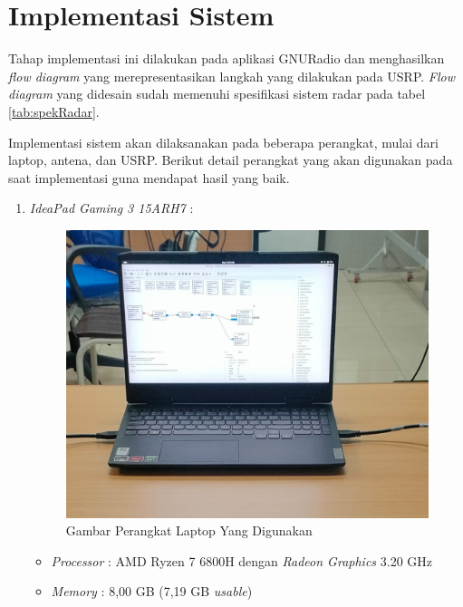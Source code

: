 \section{Implementasi Sistem}
Tahap implementasi ini dilakukan pada aplikasi GNURadio dan menghasilkan \textit{flow diagram} yang merepresentasikan langkah yang dilakukan pada USRP. \textit{Flow diagram} yang didesain sudah memenuhi spesifikasi sistem radar pada tabel \ref{tab:spekRadar}. 

Implementasi sistem akan dilaksanakan pada beberapa perangkat, mulai dari laptop, antena, dan USRP. Berikut detail perangkat yang akan digunakan pada saat implementasi guna mendapat hasil yang baik.

\begin{enumerate}
	\item \textit{IdeaPad Gaming 3 15ARH7} :
	\begin{figure}
		\begin{center}
			\includegraphics[scale=0.2]{pics/bab3/laptop.jpg} 
			\caption[Gambar Perangkat Laptop Yang Digunakan]{Gambar Perangkat Laptop Yang Digunakan}
			\label{pic:contohBlokGRC}
		\end{center}
	\end{figure}

	\begin{itemize}
		\item \textit{Processor} : AMD Ryzen 7 6800H dengan \textit{Radeon Graphics} 3.20 GHz
		\item \textit{Memory} : 8,00 GB (7,19 GB \textit{usable})
	\end{itemize}


\end{enumerate}
